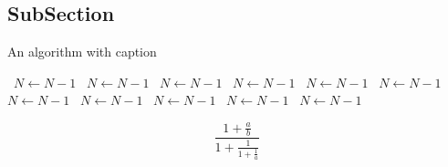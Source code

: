 \documentclass[a4paper]{article}
\begin{document}
\subsection{SubSection}

\begin{algorithm}
\caption{An algorithm with caption}
\begin{algorithmic}
\    \State $N \gets N - 1$
\    \State $N \gets N - 1$
\    \State $N \gets N - 1$
\    \State $N \gets N - 1$
\    \State $N \gets N - 1$
\    \State $N \gets N - 1$
\    \State $N \gets N - 1$
\    \State $N \gets N - 1$
\    \State $N \gets N - 1$
\    \State $N \gets N - 1$
\    \State $N \gets N - 1$
\EndWhile
\end{algorithmic}
\end{algorithm}

\[ \frac{1+\frac{a}{b}}{1+\frac{1}{1+\frac{1}{a}}} \]
\end{document}
